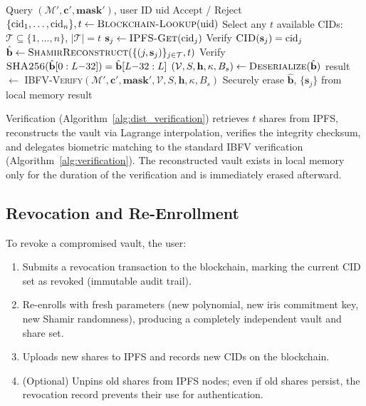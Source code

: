 \documentclass[3p,twocolumn]{elsarticle}
\newcommand{\IBFV}{\textsf{IBFV}}
\newcommand{\DIBFV}{\textsf{D-IBFV}}
\begin{document}
\begin{algorithm}[t]
\caption{\DIBFV{} Distributed Verification}
\label{alg:dist_verification}
\begin{algorithmic}[1]
\REQUIRE Query $(\mathcal{M}', \mathbf{c}', \mathbf{mask}')$, user ID $\mathrm{uid}$
\ENSURE Accept / Reject
\STATE $\{\mathrm{cid}_1, \ldots, \mathrm{cid}_n\}, t \leftarrow \textsc{Blockchain-Lookup}(\mathrm{uid})$
\STATE Select any $t$ available CIDs: $\mathcal{T} \subseteq \{1, \ldots, n\}$, $|\mathcal{T}| = t$
    \STATE $\mathbf{s}_j \leftarrow \textsc{IPFS-Get}(\mathrm{cid}_j)$ 
    \STATE Verify $\textsc{CID}(\mathbf{s}_j) = \mathrm{cid}_j$ 
\ENDFOR
\STATE $\hat{\mathbf{b}} \leftarrow \textsc{ShamirReconstruct}(\{(j, \mathbf{s}_j)\}_{j \in \mathcal{T}}, t)$
\STATE Verify $\textsc{SHA256}(\hat{\mathbf{b}}[0:L{-}32]) = \hat{\mathbf{b}}[L{-}32:L]$ 
\STATE $(\mathcal{V}, S, \mathbf{h}, \kappa, B_s) \leftarrow \textsc{Deserialize}(\hat{\mathbf{b}})$
\STATE result $\leftarrow$ \textsc{IBFV-Verify}$(\mathcal{M}', \mathbf{c}', \mathbf{mask}', \mathcal{V}, S, \mathbf{h}, \kappa, B_s)$
\STATE Securely erase $\hat{\mathbf{b}}$, $\{\mathbf{s}_j\}$ from local memory
\RETURN result
\end{algorithmic}
\end{algorithm}

Verification (Algorithm~\ref{alg:dist_verification}) retrieves $t$ shares from IPFS, reconstructs the vault via Lagrange interpolation, verifies the integrity checksum, and delegates biometric matching to the standard \IBFV{} verification (Algorithm~\ref{alg:verification}). The reconstructed vault exists in local memory only for the duration of the verification and is immediately erased afterward.

\subsection{Revocation and Re-Enrollment}
\label{sec:revocation}

To revoke a compromised vault, the user:
\begin{enumerate}
    \item Submits a revocation transaction to the blockchain, marking the current CID set as revoked (immutable audit trail).
    \item Re-enrolls with fresh parameters (new polynomial, new iris commitment key, new Shamir randomness), producing a completely independent vault and share set.
    \item Uploads new shares to IPFS and records new CIDs on the blockchain.
    \item (Optional) Unpins old shares from IPFS nodes; even if old shares persist, the revocation record prevents their use for authentication.
\end{enumerate}
\end{document}
